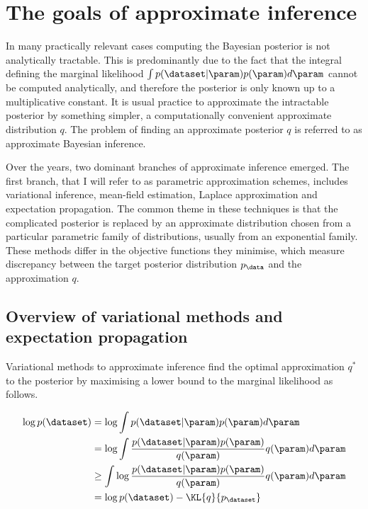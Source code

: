 \section{The goals of approximate inference}

In many practically relevant cases computing the Bayesian posterior is not analytically tractable. This is predominantly due to the fact that the integral defining the marginal likelihood $\int p(\dataset\vert\param)p(\param)d\param$ cannot be computed analytically, and therefore the posterior is only known up to a multiplicative constant. It is usual practice to approximate the intractable posterior by something simpler, a computationally convenient approximate distribution $q$. The problem of finding an approximate posterior $q$ is referred to as approximate Bayesian inference.

Over the years, two dominant branches of approximate inference emerged. The first branch, that I will refer to as parametric approximation schemes, includes variational inference, mean-field estimation, Laplace approximation and expectation propagation. The common theme in these techniques is that the complicated posterior is replaced by an approximate distribution chosen from a particular parametric family of distributions, usually from an exponential family. These methods differ in the objective functions they minimise, which measure discrepancy between the target posterior distribution $p_\data$ and the approximation $q$.

\subsection{Overview of variational methods and expectation propagation}

Variational methods to approximate inference find the optimal approximation $q^{*}$ to the posterior by maximising a lower bound to the marginal likelihood as follows.

\begin{align}
	\log p(\dataset) &= \log \int p(\dataset\vert\param)p(\param) d\param\\
		&=\log \int \frac{p(\dataset\vert\param)p(\param)}{q(\param)}q(\param) d\param\\
		&\geq \int \log \frac{p(\dataset\vert\param)p(\param)}{q(\param)} q(\param) d\param\\
		&= \log p(\dataset) - \KL{q}{p_{\dataset}}      \label{eqn:variational_lower_bound}
\end{align}

